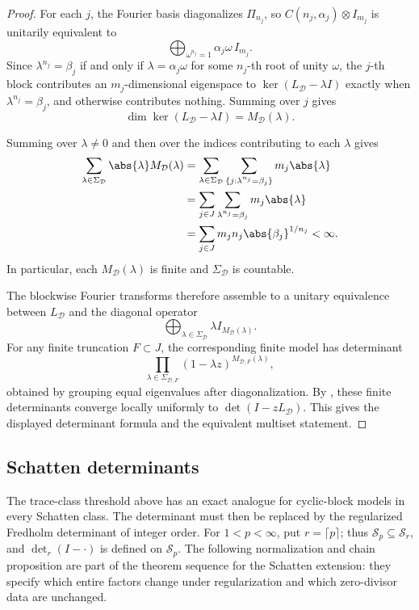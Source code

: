 \begin{proof}
  For each \(j\), the Fourier basis diagonalizes \(\Pi_{n_j}\), so
  \(C(n_j,\alpha_j)\otimes I_{m_j}\) is unitarily equivalent to
  \[
    \bigoplus_{\omega^{n_j}=1}\alpha_j\omega\,I_{m_j}.
  \]
  Since \(\lambda^{n_j}=\beta_j\) if and only if
  \(\lambda=\alpha_j\omega\) for some \(n_j\)-th root of unity \(\omega\),
  the \(j\)-th block contributes an \(m_j\)-dimensional eigenspace to
  \(\ker(L_{\mathcal D}-\lambda I)\) exactly when \(\lambda^{n_j}=\beta_j\),
  and otherwise contributes nothing. Summing over \(j\) gives
  \[
    \dim\ker(L_{\mathcal D}-\lambda I)=M_{\mathcal D}(\lambda).
  \]

  Summing over \(\lambda\neq 0\) and then over the indices contributing to
  each \(\lambda\) gives
  \begin{align*}
    \sum_{\lambda\in\Sigma_{\mathcal D}}\abs{\lambda}M_{\mathcal D}(\lambda)
    &=\sum_{\lambda\in\Sigma_{\mathcal D}}
      \sum_{\{j:\lambda^{n_j}=\beta_j\}} m_j\abs{\lambda} \\
    &=\sum_{j\in J}\sum_{\lambda^{n_j}=\beta_j} m_j\abs{\lambda} \\
    &=\sum_{j\in J}m_jn_j\abs{\beta_j}^{1/n_j}<\infty.
  \end{align*}
  In particular, each \(M_{\mathcal D}(\lambda)\) is finite and
  \(\Sigma_{\mathcal D}\) is countable.

  The blockwise Fourier transforms therefore assemble to a unitary
  equivalence between \(L_{\mathcal D}\) and the diagonal operator
  \[
    \bigoplus_{\lambda\in\Sigma_{\mathcal D}}
      \lambda I_{M_{\mathcal D}(\lambda)}.
  \]
  For any finite truncation \(F\subset J\), the corresponding finite model
  has determinant
  \[
    \prod_{\lambda\in\Sigma_{\mathcal D,F}}
      (1-\lambda z)^{M_{\mathcal D,F}(\lambda)},
  \]
  obtained by grouping equal eigenvalues after diagonalization. By
  , these finite determinants
  converge locally uniformly to \(\det(I-zL_{\mathcal D})\). This gives the
  displayed determinant formula and the equivalent multiset statement.
\end{proof}

\subsection{Schatten determinants}
\label{subsec:schatten-regularized-cyclic}

The trace-class threshold above has an exact analogue for cyclic-block
models in every Schatten class. The determinant must then be replaced by
the regularized Fredholm determinant of integer order. For
\(1<p<\infty\), put \(r=\lceil p\rceil\); thus
\(\mathcal S_p\subseteq\mathcal S_r\), and \(\det_r(I-\cdot)\) is defined
on \(\mathcal S_p\). The following normalization and chain proposition are
part of the theorem sequence for the Schatten extension: they specify which
entire factors change under regularization and which zero-divisor data are
unchanged.

